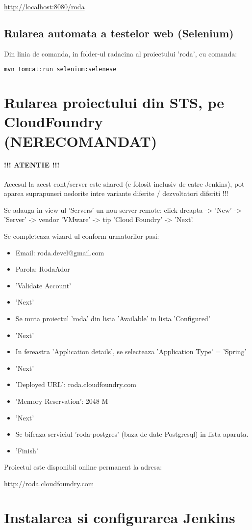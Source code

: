 \url{http://localhost:8080/roda}

\subsection{Rularea automata a testelor web (Selenium)}
Din linia de comanda, in folder-ul radacina al proiectului 'roda', cu comanda:
\begin{lstlisting}
mvn tomcat:run selenium:selenese
\end{lstlisting}

\section{Rularea proiectului din STS, pe CloudFoundry (NERECOMANDAT)}

\paragraph{!!! ATENTIE !!!} Accesul la acest cont/server este shared (e folosit
inclusiv de catre Jenkins), pot aparea suprapuneri nedorite intre variante diferite / dezvoltatori diferiti !!!

Se adauga in view-ul 'Servers' un nou server remote: click-dreapta -> 'New'
-> 'Server' -> vendor 'VMware' -> tip 'Cloud Foundry' -> 'Next'.

Se completeaza wizard-ul conform urmatorilor pasi:
\begin{itemize}
  \item 
Email: roda.devel@gmail.com
  \item 
Parola: RodaAdor
  \item 
'Validate Account'
  \item 
'Next'
  \item 
Se muta proiectul 'roda' din lista 'Available' in lista 'Configured'
  \item 
'Next'
  \item 
In fereastra 'Application details', se selecteaza 'Application Type' = 'Spring'
  \item 
'Next'
  \item 
'Deployed URL': roda.cloudfoundry.com
  \item 
'Memory Reservation': 2048 M
  \item 
'Next'
  \item 
Se bifeaza serviciul 'roda-postgres' (baza de date Postgresql) in lista
aparuta.
  \item 
'Finish'
\end{itemize}

Proiectul este disponibil online permanent la adresa:

\url{http://roda.cloudfoundry.com}

\section{Instalarea si configurarea Jenkins}

